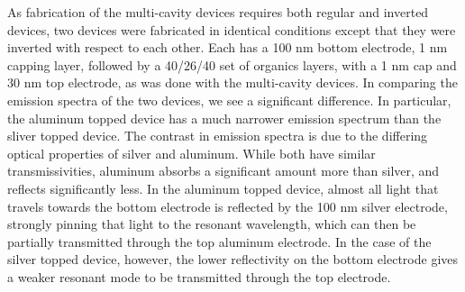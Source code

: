 \documentclass{report}
\begin{document}
            As fabrication of the multi-cavity devices requires both regular and inverted devices, two devices were fabricated in identical conditions except that they were inverted with respect to each other. Each has a 100 nm bottom electrode, 1 nm capping layer, followed by a 40/26/40 set of organics layers, with a 1 nm cap and 30 nm top electrode, as was done with the multi-cavity devices. In comparing the emission spectra of the two devices, we see a significant difference. In particular, the aluminum topped device has a much narrower emission spectrum than the sliver topped device. The contrast in emission spectra is due to the differing optical properties of silver and aluminum. While both have similar transmissivities, aluminum absorbs a significant amount more than silver, and reflects significantly less.\cite{Stavrinou1999} In the aluminum topped device, almost all light that travels towards the bottom electrode is reflected by the 100 nm silver electrode, strongly pinning that light to the resonant wavelength, which can then be partially transmitted through the top aluminum electrode. In the case of the silver topped device, however, the lower reflectivity on the bottom electrode gives a weaker resonant mode to be transmitted through the top electrode.
\end{document}
